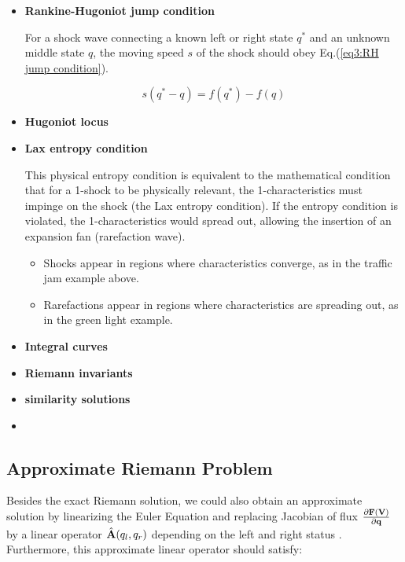 \documentclass[11pt]{diazessay} %
\begin{document}
\begin{itemize}
    \item \textbf{Rankine-Hugoniot jump condition}
    
    For a shock wave connecting a known left or right state $q^*$ and an unknown middle state $q$, the moving speed $s$ of the shock should obey Eq.(\ref{eq3:RH jump condition}).\cite{david_i_ketcheson_chapter_2020}

\begin{equation}\label{eq3:RH jump condition}
    s(q^*-q) = f(q^*) - f(q)
\end{equation}

\item \textbf{Hugoniot locus}

\item \textbf{Lax entropy condition}

This physical entropy condition is equivalent to the mathematical condition that for a 1-shock to be physically relevant, the 1-characteristics must impinge on the shock (the Lax entropy condition). If the entropy condition is violated, the 1-characteristics would spread out, allowing the insertion of an expansion fan (rarefaction wave).
\begin{itemize}
    \item Shocks appear in regions where characteristics converge, as in the traffic jam example above.
    \item Rarefactions appear in regions where characteristics are spreading out, as in the green light example.\cite{david_i_ketcheson_chapter_2020}
\end{itemize}

\item \textbf{Integral curves}

\item \textbf{Riemann invariants}

\item \textbf{similarity solutions}
\item 
\end{itemize}



\cite{sanders_introduction_nodate}
\subsection{Approximate Riemann Problem}

Besides the exact Riemann solution, we could also obtain an approximate solution by linearizing the Euler Equation and replacing Jacobian of flux $\frac{\partial \bf{F}(\bf{V})}{\partial \bf{q}}$ by a linear operator $\hat{\bf{A}}(q_l, q_r)$ depending on the left and right status \cite{roe_approximate_1981}. Furthermore, this approximate linear operator should satisfy:
\end{document}
